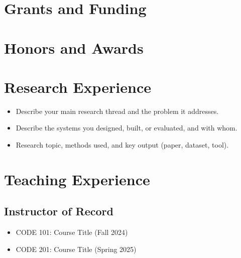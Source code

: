 \documentclass[11pt,letterpaper]{article}   %
\begin{document}
\section*{Grants and Funding}

\section*{Honors and Awards}

\section*{Research Experience}
\begin{itemize}
  \item Describe your main research thread and the problem it addresses.
  \item Describe the systems you designed, built, or evaluated, and with whom.
\end{itemize}

\begin{itemize}
  \item Research topic, methods used, and key output (paper, dataset, tool).
\end{itemize}

\section*{Teaching Experience}
\subsection{Instructor of Record}
\begin{itemize}
  \item CODE 101: Course Title (Fall 2024)
  \item CODE 201: Course Title (Spring 2025)
\end{itemize}
\end{document}
